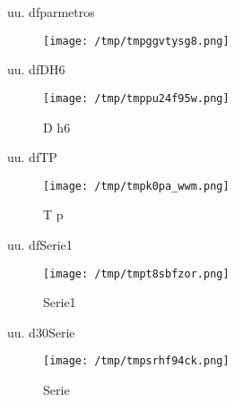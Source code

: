 \documentclass[a4paper,10pt,twocolumn]{article}
\begin{document}
\begin{Form}
\ifdefined\MostrarVariablesAlFinal
\newpage
\onecolumn



uu. dfparmetros

\begin{figure}[H] \centering
                    
                    \texttt{[image: /tmp/tmpggvtysg8.png]}
                    \caption{}
                    
                    \label{fig:dfassssdfsa}
                    \end{figure}
                    

uu. dfDH6

\begin{figure}[H] \centering
                    
                    \texttt{[image: /tmp/tmppu24f95w.png]}
                    \caption{D h6}
                    
                    \label{fig:dfassssdfsa}
                    \end{figure}
                    

uu. dfTP

\begin{figure}[H] \centering
                    
                    \texttt{[image: /tmp/tmpk0pa\_wwm.png]}
                    \caption{T p}
                    
                    \label{fig:dfassssdfsa}
                    \end{figure}
                    

uu. dfSerie1

\begin{figure}[H] \centering
                    
                    \texttt{[image: /tmp/tmpt8sbfzor.png]}
                    \caption{Serie1}
                    
                    \label{fig:dfassssdfsa}
                    \end{figure}
                    

uu. d30Serie

\begin{figure}[H] \centering
                    
                    \texttt{[image: /tmp/tmpsrhf94ck.png]}
                    \caption{Serie}
                    

\end{figure}
\end{Form}
\end{document}
